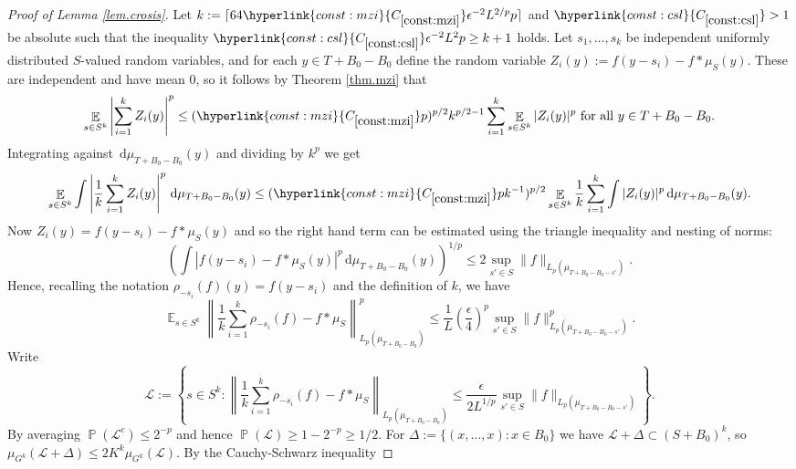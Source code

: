 \documentclass[12pt,reqno]{amsart}
\providecommand{\E}{\mathop{\mathbb{E}}}
\renewcommand{\P}{\mathop{\mathbb{P}}}
\newcommand{\dd}{\,\mathrm{d}}
\numberwithin{equation}{section}
\newcommand{\refconstbig}[1]{%
    \hyperlink{const:#1}{C_{\ref{const:#1}}}%
}
\begin{document}
\begin{proof}[Proof of Lemma \ref{lem.crosis}]
Let $k:=\lceil 64\refconstbig{mzi}\epsilon^{-2}L^{2/p}p\rceil$ and $\refconstbig{csl}>1$ be absolute such that the inequality $\refconstbig{csl}\epsilon^{-2}L^2p \geq k+1$ holds. Let $s_1,\dots,s_k$ be independent uniformly distributed $S$-valued random variables, and for each $y \in T+{B_0}-{B_0}$ define the random variable $Z_i(y):=f(y-s_i) - f \ast \mu_{S}(y)$.  These are independent and have mean $0$, so it follows by Theorem \ref{thm.mzi} that
\begin{equation*}
\E_{s \in S^k}{\left| \sum_{i=1}^k{Z_i(y)}\right|^p} \leq (\refconstbig{mzi}p)^{p/2}k^{p/2-1}\sum_{i=1}^k{\E_{s \in S^k}{|Z_i(y)|^p}} \text{ for all }y \in T+{B_0}-{B_0}.
\end{equation*}
Integrating against $\dd\mu_{T+{B_0}-{B_0}}(y)$ and dividing by $k^p$ we get
\begin{equation*}
\E_{s \in S^k}{\int{ \left|\frac{1}{k}\sum_{i=1}^k{Z_i(y)}\right|^p\dd\mu_{T+{B_0}-{B_0}}(y)}}\leq (\refconstbig{mzi}pk^{-1})^{p/2}\E_{s \in S^k}{\frac{1}{k}\sum_{i=1}^k{\int{|Z_i(y)|^p\dd\mu_{T+{B_0}-{B_0}}(y)}}}.
\end{equation*}
Now $Z_i(y)=f(y-s_i)-f \ast \mu_{S}(y)$ and so the right hand term can be estimated using the triangle inequality and nesting of norms:
\begin{equation*}
\left(\int{|f(y-s_i) - f \ast \mu_{S}(y)|^p\dd\mu_{T+{B_0}-{B_0}}(y)}\right)^{1/p} \leq 2\sup_{s' \in S}{\|f\|_{L_p(\mu_{T+{B_0}-{B_0}-s'})}}.
\end{equation*}
Hence, recalling the notation $\rho_{-s_i}(f)(y)=f(y-s_i)$ and the definition of $k$, we have
\begin{equation*}
\E_{s \in S^k}{\left\|\frac{1}{k}\sum_{i=1}^k{\rho_{-s_i}(f)} - f \ast \mu_{S}\right\|_{L_p(\mu_{T+{B_0}-{B_0}})}^p}\leq \frac{1}{L}\left(\frac{\epsilon}{4}\right)^p\sup_{s' \in S}{\|f\|_{L_p(\mu_{T+{B_0}-{B_0}-s'})}^p} .
\end{equation*}
Write
\begin{equation*}
\mathcal{L}:=\left\{s \in S^k: \left\|\frac{1}{k}\sum_{i=1}^k{\rho_{-s_i}(f)} - f \ast \mu_{S}\right\|_{L_p(\mu_{T+{B_0}-{B_0}})}\leq \frac{\epsilon}{2L^{1/p}}\sup_{s' \in S}{\|f\|_{L_p(\mu_{T+{B_0}-{B_0}-s'})}}\right\}.
\end{equation*}
By averaging $\P(\mathcal{L}^c) \leq 2^{-p}$ and hence $\P(\mathcal{L}) \geq 1-2^{-p} \geq 1/2$. For $\Delta:=\{(x,\dots,x): x \in {B_0}\}$ we have $\mathcal{L}+\Delta  \subset (S+{B_0})^k$, so $\mu_{G^k}(\mathcal{L} +\Delta)\leq 2K^k\mu_{G^k}(\mathcal{L})$. By the Cauchy-Schwarz inequality

\end{proof}
\end{document}
